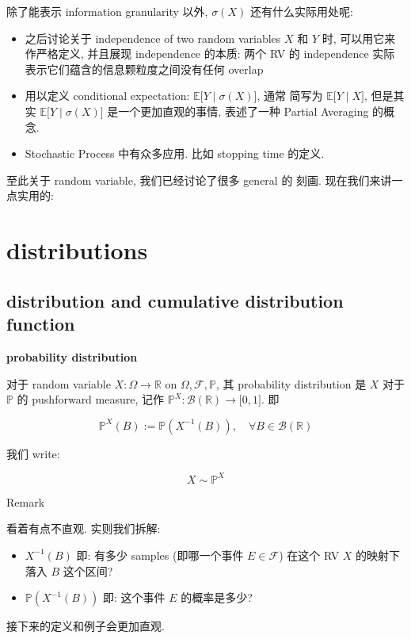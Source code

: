 \documentclass{qlnotes-export}
\begin{document}
除了能表示 information granularity 以外, \(\sigma(X)\) 还有什么实际用处呢:

\begin{itemize}
\item
  之后讨论关于 independence of two random variables \(X\) 和 \(Y\) 时, 可以用它来作严格定义, 并且展现 independence 的本质: 两个 RV 的 independence 实际表示它们蕴含的信息颗粒度之间没有任何 overlap
\item
  用以定义 conditional expectation: \(\left. {\mathbb{E}}\lbrack Y \middle| \sigma(X)\rbrack \right.\), 通常 简写为 \(\left. {\mathbb{E}}\lbrack Y \middle| X\rbrack \right.\), 但是其实 \(\left. {\mathbb{E}}\lbrack Y \middle| \sigma(X)\rbrack \right.\) 是一个更加直观的事情, 表述了一种 Partial Averaging 的概念.
\item
  Stochastic Process 中有众多应用. 比如 stopping time 的定义.
\end{itemize}

至此关于 random variable, 我们已经讨论了很多 general 的 刻画. 现在我们来讲一点实用的:

\section{distributions}\label{distributions}

\subsection{distribution and cumulative distribution function}\label{distribution-and-cumulative-distribution-function}

\begin{definition}{\protect{}\label{kn-probability-distribution}{\textbf{probability
distribution}}}

对于 random variable \(X:\Omega\rightarrow{\mathbb{R}}\) on \(\Omega,\mathcal{F},{\mathbb{P}}\), 其 probability distribution 是 \(X\) 对于 \(\mathbb{P}\) 的 pushforward measure, 记作 \({\mathbb{P}}^{X}:\mathcal{B}({\mathbb{R}})\rightarrow\lbrack 0,1\rbrack\). 即

\[{\mathbb{P}}^{X}(B) := {\mathbb{P}}(X^{- 1}(B)),\quad\forall B \in \mathcal{B}({\mathbb{R}})\]

我们 write:

\[X \sim {\mathbb{P}}^{X}\]

\end{definition}

\begin{qlremark}{Remark}

看着有点不直观. 实则我们拆解:

\begin{itemize}
\item
  \(X^{- 1}(B)\) 即: 有多少 samples (即哪一个事件 \(E \in \mathcal{F}\)) 在这个 RV \(X\) 的映射下落入 \(B\) 这个区间?
\item
  \({\mathbb{P}}(X^{- 1}(B))\) 即: 这个事件 \(E\) 的概率是多少?
\end{itemize}

接下来的定义和例子会更加直观.

\end{qlremark}
\end{document}
